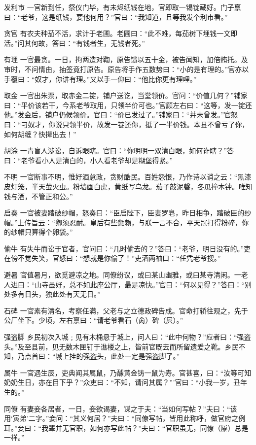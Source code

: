\documentclass[12pt,UTF8]{ctexbook}
\begin{document}
发利市
一官新到任，祭仪门毕，有未烬纸钱在地，官即取一锡锭藏好。门子禀曰：“老爷，这是纸钱，要他何用？”官曰：“我知道，且等我发个利市看。”

贪官
有农夫种茄不活，求计于老圃。老圃曰：“此不难，每茄树下埋钱一文即活。”问其何故，答曰：“有钱者生，无钱者死。”

有理
一官最贪。一日，拘两造对鞫，原告馈以五十金，被告闻知，加倍贿托。及审时，不问情由，抽签竟打原告。原告将手作五数势曰：“小的是有理的。”官亦以手覆曰：“奴才，你讲有理。”又以手一仰曰：“他比你更有理哩。”

取金
一官出朱票，取赤金二锭，铺户送讫，当堂领价。官问：“价值几何？”铺家曰：“平价该若干，今系老爷取用，只领半价可也。”官顾左右曰：“这等，发一锭还他。”发金后，铺户仍候领价。官曰：“价已发过了。”铺家曰：“并未曾发。”官怒曰：“刁奴才，你说只领半价，故发一锭还你，抵了一半价钱。本县不曾亏了你，如何胡缠？快撵出去！”

胡涂
一青盲人涉讼，自诉眼瞎。官曰：“你明明一双清白眼，如何诈瞎？”答曰：“老爷看小人是清白的，小人看老爷却是糊堡得紧。”

不明
一官断事不明，惟好酒怠政，贪财酷民。百姓怨恨，乃作诗以诮之云：“黑漆皮灯笼，半天萤火虫。粉墙画白虎，黄纸写乌龙。茄子敲泥磬，冬瓜撞木钟。唯知钱与酒，不管正和公。”

启奏
一官被妻踏破纱帽，怒奏曰：“臣启陛下，臣妻罗皂，昨日相争，踏破臣的纱帽。”上传旨云：“卿须忍耐。皇后有些惫赖，与朕一言不合，平天冠打得粉碎，你的纱帽只算得个卵袋。”

偷牛
有失牛而讼于官者，官问曰：“几时偷去的？”答曰：“老爷，明日没有的。”吏在傍不觉失笑，官怒曰：“想就是你偷了！”吏洒两袖口：“任凭老爷搜。”

避暑
官值暑月，欲觅避凉之地。同僚纷议，或曰某山幽雅，或曰某寺清闲。一老人进曰：“山寺虽好，总不如此座公厅，最是凉快。”官曰：“何以见得？”答曰：“别处多有日头，独此处有天无日。”

石碑
一官素有清名，考察任满，父老与之立德政碑告成。官命打轿往观之，先于公厂坐下。少顷，左右禀曰：“请老爷看石（肏）碑（屄）。”

强盗脚
乡民初次入城﹔见有木桶悬于城上，问人曰：“此中何物？”应者曰：“强盗头。”及至县前，见无数木匣钉于谯楼之上，皆前官既去而所留遗爱之靴。乡民不知，乃点首曰：“城上挂的强盗头，此处一定是强盗脚了。”

属牛
一官遇生辰，吏典闻其属鼠，乃醵黄金铸一鼠为寿。官甚喜，曰：“汝等可知奶奶生日，亦在目下乎？”众吏曰：“不知，请问其属？”’官曰：“小我一岁，丑年生的。”

同僚
有妻妾各居者，一日，妾欲谒妻，谋之于夫：“当如何写帖？”夫曰：“该用‘寅弟’二字。”妾问：“其义何居？”夫曰：“同僚写帖，皆用此称呼，做官府之例耳。”妾曰：“我辈并无官职，如何亦写此帖？”夫曰：“官职虽无，同僚（屪）总是一样。”
\end{document}
